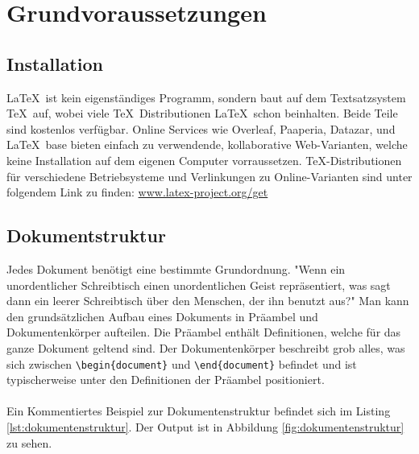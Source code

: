 \section{Grundvoraussetzungen} \label{chap:3}
\subsection{Installation}
\LaTeX\ ist kein eigenständiges Programm, sondern baut auf dem Textsatzsystem \TeX\ auf, wobei viele \TeX\ Distributionen \LaTeX\ schon beinhalten. Beide Teile sind kostenlos verfügbar.
Online Services wie Overleaf, Paaperia, Datazar, und \LaTeX\ base bieten einfach zu verwendende, kollaborative Web-Varianten, welche keine Installation auf dem eigenen Computer vorraussetzen.
TeX-Distributionen für verschiedene Betriebsysteme und Verlinkungen zu Online-Varianten sind unter folgendem Link zu finden: \url{www.latex-project.org/get}

\subsection{Dokumentstruktur}
Jedes Dokument benötigt eine bestimmte Grundordnung. 	
"Wenn ein unordentlicher Schreibtisch einen unordentlichen Geist repräsentiert, was sagt dann ein leerer Schreibtisch über den Menschen, der ihn benutzt aus?" \cite{albertzitat}
Man kann den grundsätzlichen Aufbau eines Dokuments in Präambel und Dokumentenkörper aufteilen. Die Präambel enthält Definitionen, welche für das ganze Dokument geltend sind. Der Dokumentenkörper beschreibt grob alles, was sich zwischen \texttt{\textbackslash begin\{document\}} und \texttt{\textbackslash end\{document\}} befindet und ist typischerweise unter den Definitionen der Präambel positioniert.
\cite[vgl.][S.19f]{Vosz2018}\\\\
Ein Kommentiertes Beispiel zur Dokumentenstruktur befindet sich im Listing \ref{lst:dokumentenstruktur}. Der Output ist in Abbildung \ref{fig:dokumentenstruktur} zu sehen.

